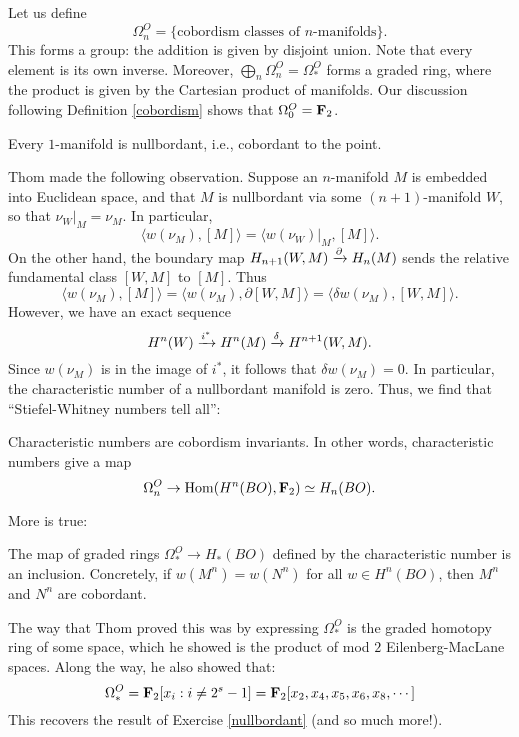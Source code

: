 Let us define
$$
\Omega^O_n = \{\text{cobordism classes of $n$-manifolds}\}.
$$
This forms a group: the addition is given by disjoint union. Note that every
element is its own inverse. Moreover, $\bigoplus_n \Omega^O_n = \Omega^O_\ast$
forms a graded ring, where the product is given by the Cartesian product of
manifolds. Our discussion following Definition \ref{cobordism} shows that
$\Omega^O_0 = \mathbf F_2$.
\begin{exercise}\label{nullbordant}
    Every $1$-manifold is nullbordant, i.e., cobordant to the point.
\end{exercise}
Thom made the following observation. Suppose an $n$-manifold $M$ is embedded
into Euclidean space, and that $M$ is nullbordant via some $(n+1)$-manifold
$W$, so that $\nu_W|_{M} = \nu_M$. In particular,
$$\langle w(\nu_M),[M]\rangle = \langle w(\nu_W)|_{M},[M]\rangle.$$
On the other hand, the boundary map $H_{n+1}(W,M) \xrightarrow{{\partial}} H_n(M)$ sends
the relative fundamental class $[W,M]$ to $[M]$. Thus
$$\langle w(\nu_M),[M]\rangle = \langle w(\nu_M),\partial[W,M]\rangle = \langle
\delta w(\nu_M),[W,M]\rangle.$$
However, we have an exact sequence
$$H^n(W)\xrightarrow{{i^\ast}} H^n(M) \xrightarrow{{\delta}} H^{n+1}(W,M).$$
Since $w(\nu_M)$ is in the image of $i^\ast$, it follows that $\delta w(\nu_M)
= 0$. In particular, the characteristic number of a nullbordant manifold is
zero. Thus, we find that ``Stiefel-Whitney numbers tell all'':
\begin{prop}
    Characteristic numbers are cobordism invariants. In other words,
    characteristic numbers give a map
    $$\Omega^O_n \to \operatorname{Hom}(H^n(BO),\mathbf F_2)\simeq H_n(BO).$$
\end{prop}
More is true:
\begin{theorem}[Thom, 1954]\label{thom-sw}
    The map of graded rings $\Omega^O_\ast\to H_\ast(BO)$ defined by the
    characteristic number is an inclusion. Concretely, if $w(M^n) = w(N^n)$ for
    all $w\in H^n(BO)$, then $M^n$ and $N^n$ are cobordant.
\end{theorem}
The way that Thom proved this was by expressing $\Omega^O_\ast$ is the graded
homotopy ring of some space, which he showed is the product of mod $2$
Eilenberg-MacLane spaces. Along the way, he also showed that:
$$
\Omega^O_\ast = \mathbf F_2[x_i:i\neq 2^s-1] = \mathbf F_2[x_2,x_4,x_5,x_6,x_8,\cdots]
$$
This recovers the result of Exercise \ref{nullbordant} (and so much more!).
